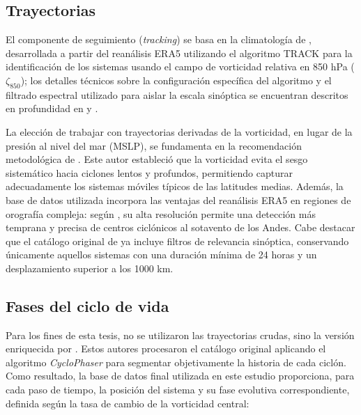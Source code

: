 \subsection{Trayectorias}\label{subsec:origen_tracking}

El componente de seguimiento (\textit{tracking}) se basa en la climatología de \citet{gramcianinov2019properties}, desarrollada a partir del reanálisis ERA5 utilizando el algoritmo TRACK para la identificación de los sistemas usando el campo de vorticidad relativa en 850 hPa ($\zeta_{850}$); los detalles técnicos sobre la configuración específica del algoritmo y el filtrado espectral utilizado para aislar la escala sinóptica se encuentran descritos en profundidad en \citet{gramcianinov2019properties} y \citet{hoskins2005new}.

La elección de trabajar con trayectorias derivadas de la vorticidad, en lugar de la presión al nivel del mar (MSLP), se fundamenta en la recomendación metodológica de \citet{sinclair1994objective}. Este autor estableció que la vorticidad evita el sesgo sistemático hacia ciclones lentos y profundos, permitiendo capturar adecuadamente los sistemas móviles típicos de las latitudes medias. Además, la base de datos utilizada incorpora las ventajas del reanálisis ERA5 en regiones de orografía compleja: según \citet{gramcianinov2020analysis}, su alta resolución permite una detección más temprana y precisa de centros ciclónicos al sotavento de los Andes. Cabe destacar que el catálogo original de \citet{gramcianinov2019properties} ya incluye filtros de relevancia sinóptica, conservando únicamente aquellos sistemas con una duración mínima de 24 horas y un desplazamiento superior a los 1000 km.

\subsection{Fases del ciclo de vida}\label{subsec:bd_enriquecida}

Para los fines de esta tesis, no se utilizaron las trayectorias crudas, sino la versión enriquecida por \citet{coutodesouza2024new}. Estos autores procesaron el catálogo original aplicando el algoritmo \textit{CycloPhaser} \citep{deSouza2025CycloPhaser} para segmentar objetivamente la historia de cada ciclón. Como resultado, la base de datos final utilizada en este estudio proporciona, para cada paso de tiempo, la posición del sistema y su fase evolutiva correspondiente, definida según la tasa de cambio de la vorticidad central:

